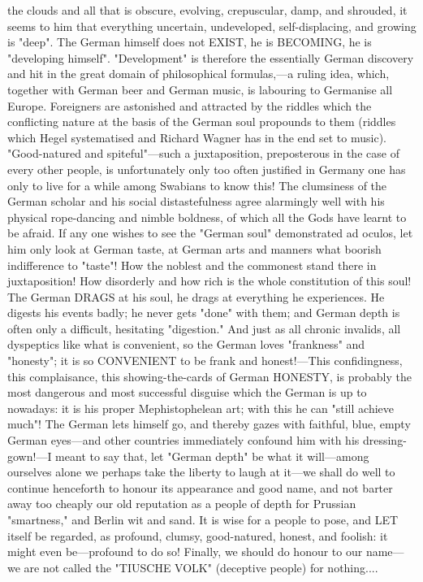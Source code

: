 \documentclass[12pt]{article}
\begin{document}
the clouds and all that is obscure, evolving, crepuscular, damp, and shrouded, it seems to him that everything uncertain, undeveloped, self-displacing, and growing is "deep". The German himself does not EXIST, he is BECOMING, he is "developing himself". "Development" is therefore the essentially German discovery and hit in the great domain of philosophical formulas,---a ruling idea, which, together with German beer and German music, is labouring to Germanise all Europe. Foreigners are astonished and attracted by the riddles which the conflicting nature at the basis of the German soul propounds to them (riddles which Hegel systematised and Richard Wagner has in the end set to music). "Good-natured and spiteful"---such a juxtaposition, preposterous in the case of every other people, is unfortunately only too often justified in Germany one has only to live for a while among Swabians to know this! The clumsiness of the German scholar and his social distastefulness agree alarmingly well with his physical rope-dancing and nimble boldness, of which all the Gods have learnt to be afraid. If any one wishes to see the "German soul" demonstrated ad oculos, let him only look at German taste, at German arts and manners what boorish indifference to "taste"! How the noblest and the commonest stand there in juxtaposition! How disorderly and how rich is the whole constitution of this soul! The German DRAGS at his soul, he drags at everything he experiences. He digests his events badly; he never gets "done" with them; and German depth is often only a difficult, hesitating "digestion." And just as all chronic invalids, all dyspeptics like what is convenient, so the German loves "frankness" and "honesty"; it is so CONVENIENT to be frank and honest!---This confidingness, this complaisance, this showing-the-cards of German HONESTY, is probably the most dangerous and most successful disguise which the German is up to nowadays: it is his proper Mephistophelean art; with this he can "still achieve much"! The German lets himself go, and thereby gazes with faithful, blue, empty German eyes---and other countries immediately confound him with his dressing-gown!---I meant to say that, let "German depth" be what it will---among ourselves alone we perhaps take the liberty to laugh at it---we shall do well to continue henceforth to honour its appearance and good name, and not barter away too cheaply our old reputation as a people of depth for Prussian "smartness," and Berlin wit and sand. It is wise for a people to pose, and LET itself be regarded, as profound, clumsy, good-natured, honest, and foolish: it might even be---profound to do so! Finally, we should do honour to our name---we are not called the "TIUSCHE VOLK" (deceptive people) for nothing....
\end{document}
